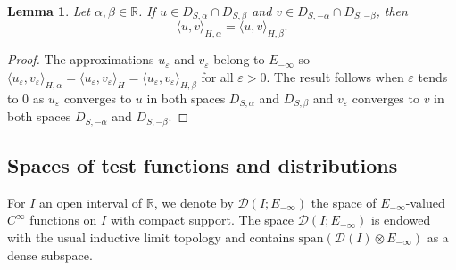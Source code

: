 \documentclass[11pt, letterpaper]{amsart}
\newtheorem{lem}[thm]{Lemma}
\theoremstyle{definition}
\theoremstyle{remark}
\numberwithin{equation}{section}
\begin{document}
\begin{lem}\label{Interpolation Jalpha bien définie}
    Let $\alpha, \beta \in \mathbb{R}$. If $u \in D_{S,\alpha}\cap D_{S,\beta}$ and $v \in D_{S,-\alpha} \cap D_{S,-\beta}$, then
   \begin{equation*}
        \langle u, v \rangle_{H,\alpha}= \langle u, v \rangle_{H,\beta}.
   \end{equation*}
\end{lem}
\begin{proof}
    The approximations $u_\varepsilon$ and $v_\varepsilon$ belong to $E_{-\infty}$ so $\langle u_\varepsilon, v_\varepsilon \rangle_{H,\alpha}=\langle u_\varepsilon, v_\varepsilon \rangle_H= \langle u_\varepsilon, v_\varepsilon \rangle_{H,\beta}$ for all $\varepsilon>0$. The result follows when $\varepsilon$ tends to $0$ as $u_\varepsilon$ converges to $u$ in both spaces $D_{S,\alpha}$ and $D_{S,\beta}$ and $v_\varepsilon$ converges to $v$ in both spaces $D_{S,-\alpha}$ and $D_{S,-\beta}$.
\end{proof}
\subsection{Spaces of test functions and distributions}\label{S2S1}
For $I$ an open interval of $\mathbb{R}$, we denote by $\mathcal{D}(I;E_{-\infty})$ the space of $E_{-\infty}$-valued $C^\infty$ functions on $I$ with compact support. The space $\mathcal{D}(I;E_{-\infty})$ is endowed with the usual inductive limit topology and contains $\mathrm{span}(\mathcal{D}(I)\otimes E_{-\infty})$ as a dense subspace.
\end{document}
